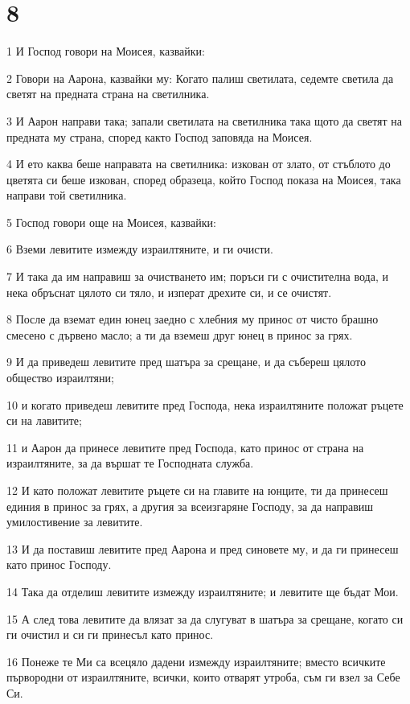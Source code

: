 \chapter{8}

\par 1 И Господ говори на Моисея, казвайки:
\par 2 Говори на Аарона, казвайки му: Когато палиш светилата, седемте светила да светят на предната страна на светилника.
\par 3 И Аарон направи така; запали светилата на светилника така щото да светят на предната му страна, според както Господ заповяда на Моисея.
\par 4 И ето каква беше направата на светилника: изкован от злато, от стъблото до цветята си беше изкован, според образеца, който Господ показа на Моисея, така направи той светилника.
\par 5 Господ говори още на Моисея, казвайки:
\par 6 Вземи левитите измежду израилтяните, и ги очисти.
\par 7 И така да им направиш за очистването им; поръси ги с очистителна вода, и нека обръснат цялото си тяло, и изперат дрехите си, и се очистят.
\par 8 После да вземат един юнец заедно с хлебния му принос от чисто брашно смесено с дървено масло; а ти да вземеш друг юнец в принос за грях.
\par 9 И да приведеш левитите пред шатъра за срещане, и да събереш цялото общество израилтяни;
\par 10 и когато приведеш левитите пред Господа, нека израилтяните положат ръцете си на лавитите;
\par 11 и Аарон да принесе левитите пред Господа, като принос от страна на израилтяните, за да вършат те Господната служба.
\par 12 И като положат левитите ръцете си на главите на юнците, ти да принесеш единия в принос за грях, а другия за всеизгаряне Господу, за да направиш умилостивение за левитите.
\par 13 И да поставиш левитите пред Аарона и пред синовете му, и да ги принесеш като принос Господу.
\par 14 Така да отделиш левитите измежду израилтяните; и левитите ще бъдат Мои.
\par 15 А след това левитите да влязат за да слугуват в шатъра за срещане, когато си ги очистил и си ги принесъл като принос.
\par 16 Понеже те Ми са всецяло дадени измежду израилтяните; вместо всичките първородни от израилтяните, всички, които отварят утроба, съм ги взел за Себе Си.
